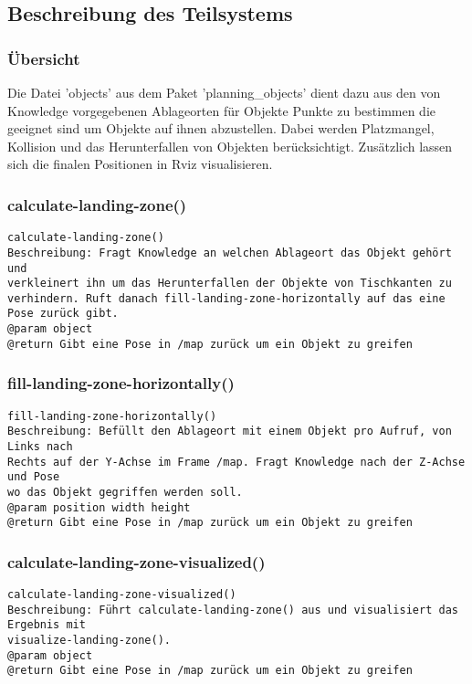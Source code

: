 \documentclass{suturo}
\begin{document}
\subsection{Beschreibung des Teilsystems}
\subsubsection{\"Ubersicht}
Die Datei 'objects' aus dem Paket 'planning\_objects' dient dazu aus den von Knowledge vorgegebenen Ablageorten für Objekte Punkte zu bestimmen die geeignet sind um Objekte auf ihnen abzustellen. Dabei werden Platzmangel, Kollision und das Herunterfallen von Objekten berücksichtigt. Zusätzlich lassen sich die finalen Positionen in Rviz visualisieren.

\subsubsection{calculate-landing-zone()}
\begin{verbatim}
calculate-landing-zone()
Beschreibung: Fragt Knowledge an welchen Ablageort das Objekt gehört und
verkleinert ihn um das Herunterfallen der Objekte von Tischkanten zu
verhindern. Ruft danach fill-landing-zone-horizontally auf das eine Pose zurück gibt.
@param object
@return Gibt eine Pose in /map zurück um ein Objekt zu greifen
\end{verbatim}

\subsubsection{fill-landing-zone-horizontally()}
\begin{verbatim}
fill-landing-zone-horizontally()
Beschreibung: Befüllt den Ablageort mit einem Objekt pro Aufruf, von Links nach
Rechts auf der Y-Achse im Frame /map. Fragt Knowledge nach der Z-Achse und Pose
wo das Objekt gegriffen werden soll.
@param position width height
@return Gibt eine Pose in /map zurück um ein Objekt zu greifen
\end{verbatim}

\subsubsection{calculate-landing-zone-visualized()}
\begin{verbatim}
calculate-landing-zone-visualized()
Beschreibung: Führt calculate-landing-zone() aus und visualisiert das Ergebnis mit
visualize-landing-zone().
@param object
@return Gibt eine Pose in /map zurück um ein Objekt zu greifen
\end{verbatim}
\end{document}
